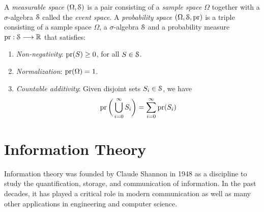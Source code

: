 \documentclass[a4paper, 12pt]{book} %
\begin{document}
A \emph{measurable space} $(\Omega, \EuScript{S})$ is a pair consisting of a \emph{sample space} $\Omega$ together with a $\sigma$-algebra $\EuScript{S}$ called the \emph{event space}. A \emph{probability space} $(\Omega, \EuScript{S}, \operatorname{pr})$ is a triple consisting of a sample space $\Omega$, a $\sigma$-algebra $\EuScript{S}$ and a probability measure $\operatorname{pr}: \EuScript{S} \longrightarrow \mathbb{R}$ that satisfies:
\begin{enumerate}
    \item \emph{Non-negativity}: $\operatorname{pr}(S) \geq 0$, for all $S \in \EuScript{S}$.
    \item \emph{Normalization}: $\operatorname{pr}(\Omega) = 1$.
    \item \emph{Countable additivity}: Given disjoint sets $S_i \in \EuScript{S}$, we have 
    \begin{align}
        \operatorname{pr}\bigg( \bigcup_{i=0}^\infty S_i \bigg) = \sum_{i=0}^\infty \operatorname{pr}(S_i)
    \end{align}
\end{enumerate}

\chapter{Information Theory}
Information theory was founded by Claude Shannon in 1948 as a discipline to study the quantification, storage, and communication of information. In the past decades, it has played a critical role in modern communication as well as many other applications in engineering and computer science.  
\end{document}
